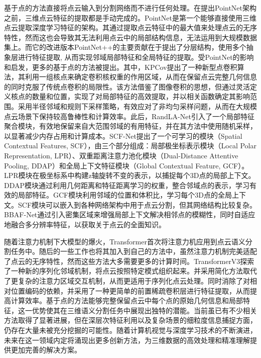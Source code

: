 基于点的方法直接将点云输入到分割网络而不进行任何处理。在提出PointNet架构之前，三维点云特征的提取都是手动完成的。PointNet是第一个能够直接使用三维点云提取深度学习特征的架构。其通过提取点云特征中的最大值来处理点云的无序特性，然而这也会导致其无法利用点云中的局部结构信息，无法运用到大规模数据集上。而它的改进版本PointNet++的主要贡献在于提出了分层结构，使用多个抽象层进行特征提取, 从而实现邻域局部特征和全局特征的提取。受PointNet的影响和启发，更多的基于点的方法被提出。其中，KPCov提出了一种新型点卷积算法，其利用一组核点来确定卷积核权重的作用区域，从而在保留点云完整几何信息的同时克服了传统点卷积的局限性。该方法借鉴了图像卷积的思想，但通过灵活定义核点的数量和位置，实现了对局部特征的高效提取，并以相关函数确定其影响范围。采用半径邻域和规则下采样策略，有效应对了非均匀采样问题，从而在大规模点云场景下保持较高鲁棒性和计算效率。此后，RandLA-Net引入了一个局部特征聚合模块，有效地保留来自大范围邻域的有用特征，并在其方法中使用随机采样，以显著减少内存占用和计算成本。SCF-Net提出了一个可学习的模块（Spatial Contextual Features, SCF），由三个部分组成：局部极坐标表示模块（Local Polar Representation, LPR）、双重距离注意力池化模块（Dual-Distance Attentive Pooling, DDAP）和全局上下文特征模块（Global Contextual Feature, GCF）。LPR模块在极坐标系中构建z轴旋转不变的表示，以捕捉每个3D点的局部上下文。DDAP模块通过利用几何距离和特征距离学习的权重，整合邻域点的表示，学习有效的局部特征。GCF模块利用邻域的位置和体积比，学习每个3D点的全局上下文。SCF模块可以嵌入到各种网络架构中用于点云分割，但其网络结构比较复杂。BBAF-Net通过引入密集区域来增强局部上下文解决相邻点的模糊性，同时自适应地融合多分辨率特征，以获取关于点云的全面知识。

随着注意力机制下大模型的爆火，Transformer首次将注意力机应用到点云语义分割任务中。随后的一些工作也将其加入到自己的方法中，虽然注意力机制完美适配了点云的无序特性，然而这些方法大多需要更多的计算时间。TransformerV3探索了一种新的序列化邻域机制，将点云按照特定模式组织起来。并采用简化方法取代了更复杂的注意力区域交互机制，从而更适用于序列化点云处理。同时消除了对相对位置编码的依赖，并采用了一种更简单的前置稀疏卷积层进行特征提取，从而提高计算效率。基于点的方法能够完整保留点云中每个点的原始几何信息和局部特征，这一优势使其在三维语义分割任务中展现出独特的潜能。当前虽已有不少相关方法取得了显著进展，但在深层次特征利用以及复杂场景的细粒度信息捕捉方面，仍存在大量未被充分挖掘的可能性。随着计算机视觉与深度学习技术的不断演进，未来在这一领域内定将涌现出更多创新方法，为三维数据的高效处理和精准理解提供更加完善的解决方案。

